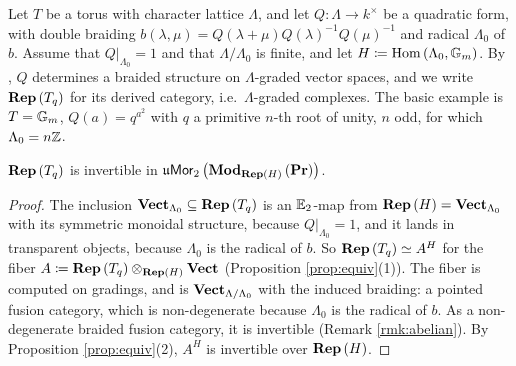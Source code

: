 \label{sec:tori}

Let $T$ be a torus with character lattice $\Lambda$, and let $Q\colon\Lambda\to k^\times$ be a
quadratic form, with double braiding
$b\left(\lambda,\mu\right)=Q\left(\lambda+\mu\right)Q\left(\lambda\right)^{-1}Q\left(\mu\right)^{-1}$
and radical $\Lambda_0$ of $b$. Assume that $Q|_{\Lambda_0}=1$ and that $\Lambda/\Lambda_0$ is
finite, and let $H\coloneqq\operatorname{Hom}\left(\Lambda_0,\mathbb{G}_m\right)$. By \cite{JS:braided}, $Q$ determines a
braided structure on $\Lambda$-graded vector spaces, and we write $\mathbf{Rep}\left(T_q\right)$ for its
derived category, i.e.\ $\Lambda$-graded complexes. The basic example is $T=\mathbb{G}_m$,
$Q\left(a\right)=q^{a^2}$ with $q$ a primitive $n$-th root of unity, $n$ odd, for which
$\Lambda_0=n\mathbb{Z}$.

\begin{theorem}
\label{thm:T_invertible}
$\mathbf{Rep}\left(T_q\right)$ is invertible in $\mathfrak{u}\mathsf{Mor}_2\left(\mathbf{Mod}_{\mathbf{Rep}\left(H\right)}\left(\mathbf{Pr}\right)\right)$.
\end{theorem}

\begin{proof}
The inclusion $\mathbf{Vect}_{\Lambda_0}\subseteq\mathbf{Rep}\left(T_q\right)$ is an $\mathbb{E}_2$-map from
$\mathbf{Rep}\left(H\right)=\mathbf{Vect}_{\Lambda_0}$ with its symmetric monoidal structure, because
$Q|_{\Lambda_0}=1$, and it lands in transparent objects, because $\Lambda_0$ is the radical of $b$. So $\mathbf{Rep}\left(T_q\right)\simeq A^H$ for the fiber
$A\coloneqq\mathbf{Rep}\left(T_q\right)\otimes_{\mathbf{Rep}\left(H\right)}\mathbf{Vect}$ (Proposition \ref{prop:equiv}(1)). The
fiber is computed on gradings, and is $\mathbf{Vect}_{\Lambda/\Lambda_0}$ with the induced braiding: a
pointed fusion category, which is non-degenerate because $\Lambda_0$ is the radical of $b$. As a
non-degenerate braided fusion category, it is invertible \cite[Theorem 1.1]{BJSS} (Remark \ref{rmk:abelian}). By Proposition \ref{prop:equiv}(2), $A^H$ is
invertible over $\mathbf{Rep}\left(H\right)$.
\end{proof}
